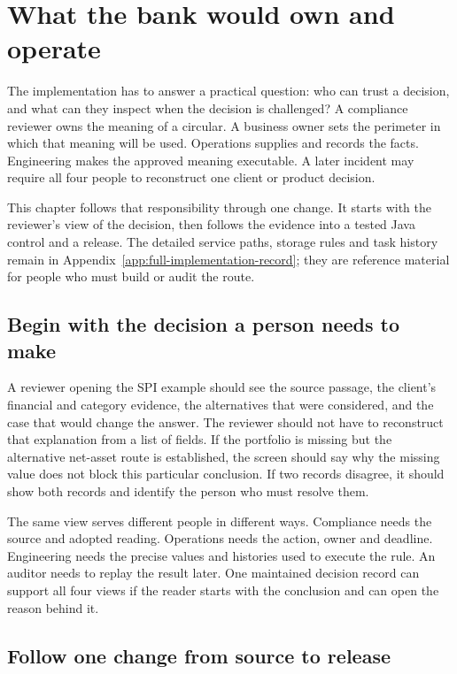 \chapter{What the bank would own and operate}
\label{ch:implementation}

The implementation has to answer a practical question: who can trust a decision,
and what can they inspect when the decision is challenged? A compliance
reviewer owns the meaning of a circular. A business owner sets the perimeter in
which that meaning will be used. Operations supplies and records the facts.
Engineering makes the approved meaning executable. A later incident may require
all four people to reconstruct one client or product decision.

This chapter follows that responsibility through one change. It starts with the
reviewer's view of the decision, then follows the evidence into a tested Java
control and a release. The detailed service paths, storage rules and task history
remain in Appendix~\ref{app:full-implementation-record}; they are reference
material for people who must build or audit the route.

\section{Begin with the decision a person needs to make}

A reviewer opening the SPI example should see the source passage, the client's
financial and category evidence, the alternatives that were considered, and the
case that would change the answer. The reviewer should not have to reconstruct
that explanation from a list of fields. If the portfolio is missing but the
alternative net-asset route is established, the screen should say why the missing
value does not block this particular conclusion. If two records disagree, it
should show both records and identify the person who must resolve them.

The same view serves different people in different ways. Compliance needs the
source and adopted reading. Operations needs the action, owner and deadline.
Engineering needs the precise values and histories used to execute the rule. An
auditor needs to replay the result later. One maintained decision record can
support all four views if the reader starts with the conclusion and can open the
reason behind it.

\section{Follow one change from source to release}

